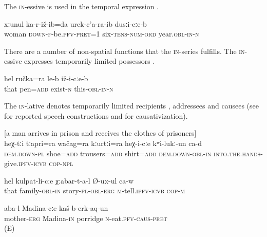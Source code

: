 The \textsc{in}-essive is used in the temporal expression  .
%
\begin{exe}
	\ex	\label{I married in 1960}
	\gll	xːunul	ka-r-iž-ib=da	urek-c'a-ra-ib	dusːi-cːe-b\\
		woman	\textsc{down}-\textsc{f}-be.\textsc{pfv}-\textsc{pret}=1	six-\textsc{tens-num}-\textsc{ord}	year.\textsc{obl}-\textsc{in}-\textsc{n}\\
	\glt	{}
\end{exe}

There are a number of non-spatial functions that the \textsc{in}-series fulfills. The \textsc{in}-essive expresses temporarily limited possessors .
%
\begin{exe}
	\ex	\label{He has a pen (in his hands}
	\gll	hel	ručka=ra	le-b	iž-i-cːe-b \\
		that	pen=\textsc{add}	exist-\textsc{n}	this-\textsc{obl-in}-\textsc{n}\\
	\glt	{}
\end{exe}

The \textsc{in}-lative denotes temporarily limited recipients , addressees  and causees  (see  for reported speech constructions and  for causativization).
%
\begin{exe}
	\ex	 \label{the shoes, the trousers, the shirt is handed over to him}
	[a man arrives in prison and receives the clothes of prisoners]\\
	\gll	heχ-tːi	tːapri=ra	wačag=ra	kːurtːi=ra	heχ-i-cːe	kʷi-lukː-un ca-d\\
		\textsc{dem.down}-\textsc{pl}	shoe=\textsc{add}	trousers=\textsc{add}	shirt=\textsc{add}	\textsc{dem.down}-\textsc{obl-in}	\textsc{into.the.hands}-give.\textsc{ipfv}-\textsc{icvb} \textsc{cop-npl}\\
	\glt	{}

	\ex	\label{He is telling the stories to his family}
	\gll	hel	kulpat-li-cːe	χːabar-t-a-l	Ø-ux-ul ca-w \\
		that	family-\textsc{obl-in}	story-\textsc{pl}-\textsc{obl}-\textsc{erg}	\textsc{m}-tell.\textsc{ipfv}-\textsc{icvb} \textsc{cop-m}\\
	\glt	{}
	
	\ex	\label{Mother made Madina eat porridge}
	\gll	aba-l	Madina-cːe	kaš	b-erk-aq-un\\
		mother-\textsc{erg}	Madina-\textsc{in}	porridge	\textsc{n}-eat.\textsc{pfv}-\textsc{caus}-\textsc{pret}\\
	\glt	{} (E)
\end{exe}

